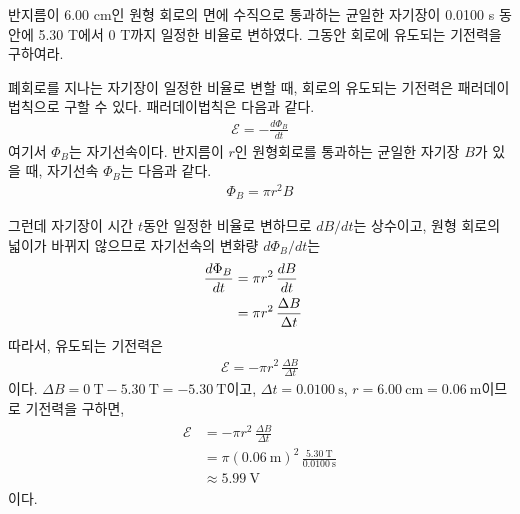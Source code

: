 \documentclass[tightenlines,floatfix,nofootinbib,superscriptaddress,fleqn]{revtex4}
\begin{document}
\vspace{1.cm}

반지름이 6.00 cm인 원형 회로의 면에 수직으로 통과하는 균일한 자기장이
0.0100 s 동안에 5.30 T에서 0 T까지 일정한 비율로 변하였다. 그동안
회로에 유도되는 기전력을 구하여라.

폐회로를 지나는 자기장이 일정한 비율로 변할 때, 회로의 유도되는 기전력은
패러데이 법칙으로 구할 수 있다. 패러데이법칙은 다음과 같다.
\begin{align}
  \mathcal{E} =-\frac{d\Phi_B}{dt}
  \label{eq:3-1}
\end{align}
여기서 $\Phi_B$는 자기선속이다.
반지름이 $r$인 원형회로를 통과하는 균일한 자기장 $B$가 있을 때,
자기선속 $\Phi_B$는 다음과 같다.
\begin{align}
  \Phi_B=\pi r^2 B
  \label{eq:3-2}
\end{align}

그런데 자기장이 시간 $t$동안 일정한 비율로 변하므로 $dB/dt$는
상수이고, 원형 회로의 넓이가 바뀌지 않으므로 자기선속의 변화량 
${d\Phi_B}/{dt}$는
\begin{align}
  \frac{d\Phi_B}{dt}&=\pi r^2 \,\frac{dB}{dt}\cr
  &=\pi r^2\, \frac{\Delta B}{\Delta t}
  \label{eq:3-3}
\end{align}
따라서, 유도되는 기전력은
\begin{align}
  \mathcal{E}=-\pi r^2\, \frac{\Delta B}{\Delta t}
  \label{eq:3-4}
\end{align}
이다. $\Delta B=0~\mathrm{T}-5.30~\mathrm{T}=-5.30~\mathrm{T}$이고,
$\Delta t=0.0100~\mathrm{s}$, $r=6.00~\mathrm{cm}=0.06~\mathrm{m}$이므로
기전력을 구하면,
\begin{align}
  \begin{split}
    \mathcal{E}&=-\pi r^2\, \frac{\Delta B}{\Delta t}\\
    &=\pi (0.06~\mathrm{m})^2\, \frac{5.30~\mathrm{T}}{0.0100~\mathrm{s}}\\
    &\approx 5.99~\mathrm{V}
    \end{split}
  \label{eq:3-5}
\end{align}
이다.

\vspace{1.cm}
\end{document}
